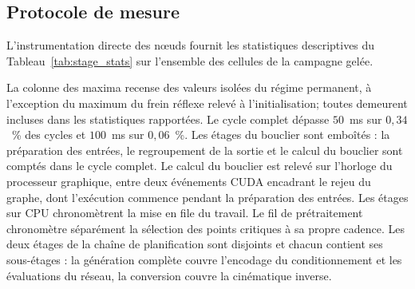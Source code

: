\subsection{Protocole de mesure}
L'instrumentation directe des n\oe uds fournit les statistiques descriptives du Tableau~\ref{tab:stage_stats} sur l'ensemble des cellules de la campagne gelée.

La colonne des maxima recense des valeurs isolées du régime permanent, à l'exception du maximum du frein réflexe relevé à l'initialisation; toutes demeurent incluses dans les statistiques rapportées. Le cycle complet dépasse $50$~ms sur $0{,}34$~\% des cycles et $100$~ms sur $0{,}06$~\%. Les étages du bouclier sont emboîtés : la préparation des entrées, le regroupement de la sortie et le calcul du bouclier sont comptés dans le cycle complet. Le calcul du bouclier est relevé sur l'horloge du processeur graphique, entre deux événements \ac{CUDA} encadrant le rejeu du graphe, dont l'exécution commence pendant la préparation des entrées. Les étages sur \ac{CPU} chronomètrent la mise en file du travail. Le fil de prétraitement chronomètre séparément la sélection des points critiques à sa propre cadence. Les deux étages de la chaîne de planification sont disjoints et chacun contient ses sous-étages : la génération complète couvre l'encodage du conditionnement et les évaluations du réseau, la conversion couvre la cinématique inverse.

